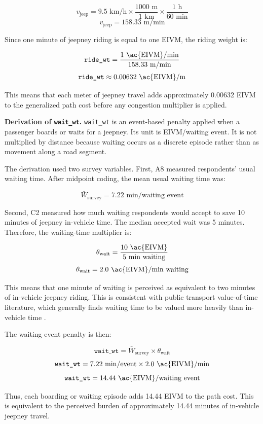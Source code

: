 {\[
v_{\text{jeep}} = 9.5 \text{ km/h} \times \frac{1000 \text{ m}}{1 \text{ km}} \times \frac{1 \text{ h}}{60 \text{ min}}
\]
\[
v_{\text{jeep}} = 158.33 \text{ m/min}
\]

Since one minute of jeepney riding is equal to one \ac{EIVM}, the riding weight is:

\[
\texttt{ride\_wt} = \frac{1 \text{ \ac{EIVM}/min}}{158.33 \text{ m/min}}
\]
\[
\texttt{ride\_wt} \approx 0.00632 \text{ \ac{EIVM}/m}
\]

This means that each meter of jeepney travel adds approximately 0.00632 \ac{EIVM} to the generalized path cost before any congestion multiplier is applied.

\noindent\textbf{Derivation of \texttt{wait\_wt}.}
\texttt{wait\_wt} is an event-based penalty applied when a passenger boards or waits for a jeepney. Its unit is \ac{EIVM}/waiting event. It is not multiplied by distance because waiting occurs as a discrete episode rather than as movement along a road segment.

The derivation used two survey variables. First, A8 measured respondents' usual waiting time. After midpoint coding, the mean usual waiting time was:

\[
\bar{W}_{\text{survey}} = 7.22 \text{ min/waiting event}
\]

Second, C2 measured how much waiting respondents would accept to save 10 minutes of jeepney in-vehicle time. The median accepted wait was 5 minutes. Therefore, the waiting-time multiplier is:

\[
\theta_{\text{wait}} = \frac{10 \text{ \ac{EIVM}}}{5 \text{ min waiting}}
\]
\[
\theta_{\text{wait}} = 2.0 \text{ \ac{EIVM}/min waiting}
\]

This means that one minute of waiting is perceived as equivalent to two minutes of in-vehicle jeepney riding. This is consistent with public transport value-of-time literature, which generally finds waiting time to be valued more heavily than in-vehicle time \citep{wardman2004public,itfoecd2014valuing}.

The waiting event penalty is then:

\[
\texttt{wait\_wt} = \bar{W}_{\text{survey}} \times \theta_{\text{wait}}
\]
\[
\texttt{wait\_wt} = 7.22 \text{ min/event} \times 2.0 \text{ \ac{EIVM}/min}
\]
\[
\texttt{wait\_wt} = 14.44 \text{ \ac{EIVM}/waiting event}
\]

Thus, each boarding or waiting episode adds 14.44 \ac{EIVM} to the path cost. This is equivalent to the perceived burden of approximately 14.44 minutes of in-vehicle jeepney travel.

}
